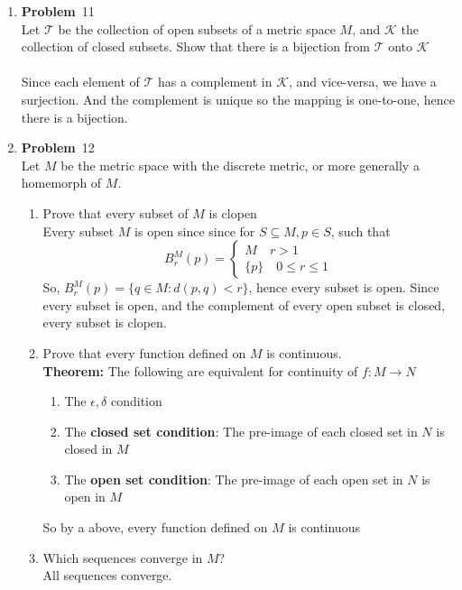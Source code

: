 \documentclass[12pt]{amsart}
\newcommand{\benu}{\begin{enumerate}}
\newcommand{\eenu}{\end{enumerate}}
\theoremstyle{definition}
\newcommand{\mc}[1]{\mathcal{#1}}
\newcommand{\itep}{\item {\bfseries Problem}\ }
\begin{document}
\begin{enumerate}[series=p]
\itep 11\\
Let $\mc{T}$ be the collection of open subsets of a metric space $M$, and $\mc{K}$ the collection of closed subsets.  Show that there is a bijection from $\mc{T}$ onto $\mc{K}$
\\\\
Since each element of $\mc{T}$ has a complement in $\mc{K}$, and vice-versa, we have a surjection.  And the complement is unique so the mapping is one-to-one, hence there is a bijection. 
\newpage

\itep 12\\
Let $M$ be the metric space with the discrete metric, or more generally a homemorph of $M$.
\benu
\item Prove that every subset of $M$ is clopen\\
Every subset $M$ is open since since for $S \subseteq M, p \in S$, such that
\[
B^M_r(p) = 
\begin{cases}
	M \quad r > 1\\    
	\{p\} \quad  0 \leq r \leq 1
\end{cases}
\]
So, $B_r^M(p) = \{q \in M : d(p,q) < r\}$, hence every subset is open.  
Since every subset is open, and the complement of every open subset is closed, every subset is clopen.
\item Prove that every function defined on $M$ is continuous.\\

\textbf{Theorem:} The following are equivalent for continuity of $f:M \to N$
\benu
\item The $\epsilon, \delta$ condition
\item The \textbf{closed set condition}: The pre-image of each closed set in $N$ is closed in $M$
\item The \textbf{open set condition}: The pre-image of each open set in $N$ is open in $M$
\eenu
So by a above, every function defined on $M$ is continuous

\item Which sequences converge in $M$?\\
All sequences converge.
\eenu

\newpage


\end{enumerate}
\end{document}
